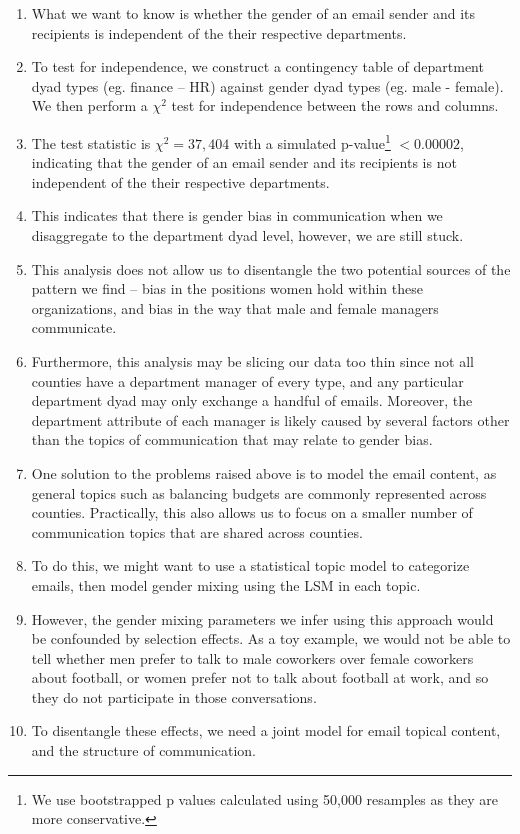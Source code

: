 \documentclass[fleqn]{MJDArticle}
\begin{document}
\begin{enumerate}
	\item What we want to know is whether the gender of an email sender and its recipients is independent of the their respective departments. 
	
	\item To test for independence, we construct a contingency table of department dyad types (eg. finance -- HR) against gender dyad types (eg. male - female). We then perform a $\chi^2$ test for independence between the rows and columns.
	
	\item The test statistic is $\chi^2 = 37,404$ with a simulated p-value\footnote{We use bootstrapped p values calculated using 50,000 resamples as they are more conservative.} $< 0.00002$, indicating that the gender of an email sender and its recipients is not independent of the their respective departments.
	
	\item This indicates that there is gender bias in communication when we disaggregate to the department dyad level, however, we are still stuck.
	
	\item This analysis does not allow us to disentangle the two potential sources of the pattern we find -- bias in the positions women hold within these organizations, and bias in the way that male and female managers communicate. 
	
	\item Furthermore, this analysis may be slicing our data too thin since not all counties have a department manager of every type, and any particular department dyad may only exchange a handful of emails. Moreover, the department attribute of each manager is likely caused by several factors other than the topics of communication that may relate to gender bias. 
	
	\item One solution to the problems raised above is to model the email content, as general topics such as balancing budgets are commonly represented across counties. Practically, this also allows us to focus on a smaller number of communication topics that are shared across counties.
	
	\item To do this, we might want to use a statistical topic model to categorize emails, then model  gender mixing using the LSM in each topic.
	
	\item However, the gender mixing parameters we infer using this approach would be confounded by selection effects. As a toy example, we would not be able to tell whether men prefer to talk to male coworkers over female coworkers about football, or women prefer not to talk about football at work, and so they do not participate in those conversations. 
	
	\item To disentangle these effects, we need a joint model for email topical content, and the structure of communication.
	
\end{enumerate}
	
\end{document}
